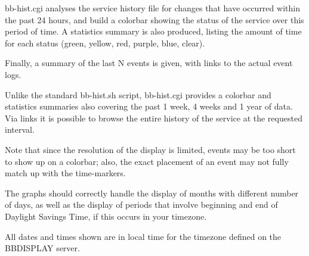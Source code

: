   bb-hist.cgi analyses the service history file for changes that have
  occurred within the past 24 hours, and build a colorbar showing the
  status of the service over this period of time. A statistics summary
  is also produced, listing the amount of time for each status (green,
  yellow, red, purple, blue, clear). 



  Finally, a summary of the last N events is given, with links to the actual event logs. 


  Unlike the standard bb-hist.sh script, bb-hist.cgi provides a
  colorbar and statistics summaries also covering the past 1 week, 4
  weeks and 1 year of data. Via links it is possible to browse the
  entire history of the service at the requested interval. 



  Note that since the resolution of the display is limited, events may
  be too short to show up on a colorbar; also, the exact placement of
  an event may not fully match up with the time-markers. 



  The graphs should correctly handle the display of months with
  different number of days, as well as the display of periods that
  involve beginning and end of Daylight Savings Time, if this occurs
  in your timezone. 



  All dates and times shown are in local time for the timezone defined on the BBDISPLAY server. 


 


 
